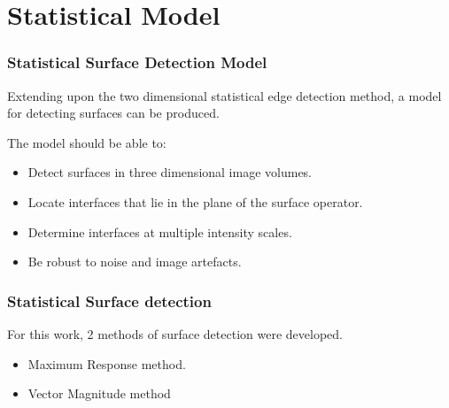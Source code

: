 \documentclass[9pt]{beamer}
\begin{document}
\section{Statistical Model}
	\begin{frame}
			\frametitle{Statistical Surface Detection Model}

Extending upon the two dimensional statistical edge detection method, a model for detecting surfaces can be produced.

The model should be able to:
				\begin{itemize}
						\item Detect surfaces in three dimensional image volumes.
						\item Locate interfaces that lie in the plane of the surface operator.
						\item Determine interfaces at multiple intensity scales.
						\item Be robust to noise and image artefacts. 
				\end{itemize} 

	\end{frame}

 \begin{frame}
 \frametitle{ Statistical Surface detection}
For this work, 2 methods of surface detection were developed.
 \begin{itemize}
 \item Maximum Response method.
 \item Vector Magnitude method
 \end{itemize}
 \end{frame}
 
\end{document}
